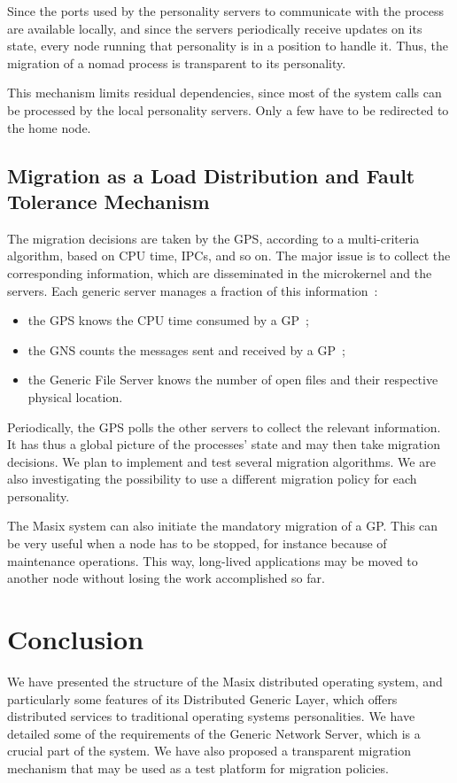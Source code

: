 Since the ports used by the personality servers to communicate with the process are available locally, and since the servers periodically receive updates on its state, every node running that personality is in a position to handle it.
Thus, the migration of a nomad process is transparent to its personality. 

This mechanism limits residual dependencies, since most of the system calls
can be processed by the local personality servers. Only a few have to be 
redirected to the home node.
 
\subsection{Migration as a Load Distribution and Fault Tolerance Mechanism}

The migration decisions are taken by the GPS, according to a multi-criteria
algorithm, based on CPU time, IPCs, and so on. 
The major issue is to collect the corresponding information, which are 
disseminated in the microkernel and the servers. Each generic server manages
a fraction of this information~:
\begin{itemize}
\item the GPS knows the CPU time consumed by a GP~;
\item the GNS counts the messages sent and received by a GP~;
\item the Generic File Server knows the number of open files and their
respective physical location.
\end{itemize}
Periodically, the GPS polls the other servers to collect the relevant information. It has thus a global picture of the processes' state and may then take
migration decisions. We plan to implement and test several migration
algorithms. We are also investigating the possibility to use 
a different migration policy for each personality. 

The Masix system can also initiate the mandatory migration of a GP. This
can be very useful when a node has to be stopped, for instance because of
maintenance operations. This way, long-lived applications may be moved
to another node without losing the work accomplished so far.

\section{Conclusion}

We have presented the structure of the Masix distributed operating
system, and particularly some features of its Distributed Generic Layer, 
which offers
distributed services to traditional operating systems personalities.
We have detailed some of the requirements of the Generic Network Server, which is
a crucial part of the system. We have also
proposed a transparent migration mechanism that may be used as a test 
platform for migration policies. 





